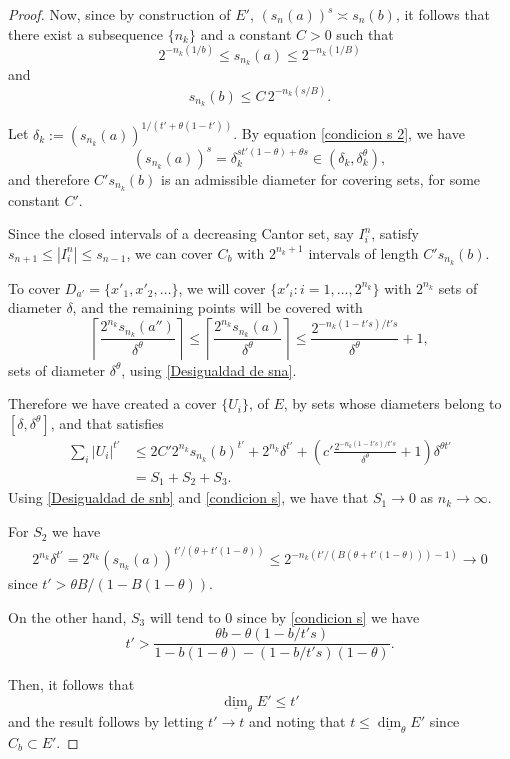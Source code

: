 \documentclass[10pt,a4paper]{amsart}
\begin{document}
\begin{proof}
Now, since by construction of $E'$, $(s_n(a))^s \asymp s_n(b)$, it follows that there exist a subsequence $\{n_k\}$ and a constant $C > 0$ such that
\begin{equation}\label{Desigualdad de sna}
2^{-n_k(1/b)} \leq s_{n_k}(a) \leq 2^{-n_k(1/B)}
\end{equation}
and
\begin{equation}\label{Desigualdad de snb}
s_{n_k}(b) \leq C \, 2^{-n_k(s/B)}.
\end{equation}



Let $\delta_k := (s_{n_k}(a))^{1/(t' + \theta(1 - t'))}$. 
By equation \eqref{condicion s 2}, we have 
\[
(s_{n_k}(a))^s = \delta_k^{s t'(1 - \theta) + \theta s} \in (\delta_k, \delta_k^\theta),
\]
and therefore $C' s_{n_k}(b)$ is an admissible diameter for covering sets, for some constant $C'$.

Since the closed intervals of a decreasing Cantor set, say \( I_i^n \), satisfy \( s_{n+1} \leq |I_i^n| \leq s_{n-1} \), we can cover \( C_b \) with \( 2^{n_k + 1} \) intervals of length \(C' s_{n_k}(b) \).

To cover \( D_{a'} = \{x'_1, x'_2, \ldots\} \), we will cover \( \{x'_i : i = 1, \ldots, 2^{n_k}\} \) with \( 2^{n_k} \) sets of diameter \( \delta \), and the remaining points will be covered with
\[
\left\lceil \frac{2^{n_k} s_{n_k}(a'')}{\delta^\theta} \right\rceil \leq \left\lceil \frac{2^{n_k} s_{n_k}(a)}{\delta^\theta} \right\rceil \leq \frac{2^{-n_k(1 - t's)/t's}}{\delta^\theta} + 1,
\]
sets of diameter \( \delta^\theta \), using \eqref{Desigualdad de sna}.


Therefore we have created a cover \( \{U_i\} \), of \( E \), by sets whose diameters belong to \( [\delta, \delta^{\theta}] \), and that satisfies
\begin{align*}
    \sum_i |U_i|^{t'} &\leq 2C' 2^{n_k} s_{n_k}(b)^{t'} + 2^{n_k} \delta^{t'} + \left( c' \frac{2^{-n_k(1 - t's)/t's}}{\delta^\theta} + 1 \right) \delta^{\theta t'} \\
    &= S_1 + S_2 + S_3.
\end{align*}
Using \eqref{Desigualdad de snb} and \eqref{condicion s}, we have that \( S_1 \to 0 \) as \( n_k \to \infty \).

For \( S_2 \) we have
\begin{align*}
    2^{n_k} \delta^{t'} = 2^{n_k} (s_{n_k}(a))^{t'/(\theta + t'(1 - \theta))} \leq 2^{-n_k(t'/(B(\theta + t'(1 - \theta))) - 1)} \to 0
\end{align*}
since \( t' > \theta B / (1 - B(1 - \theta)) \).

On the other hand, \( S_3 \) will tend to \( 0 \) since by \eqref{condicion s} we have 
\[
t' > \frac{\theta b - \theta(1 - b / t's)}{1 - b(1 - \theta) - (1 - b / t's)(1 - \theta)}.
\]

Then, it follows that
\[
\underline{\dim}_\theta E' \leq t'
\]
and the result follows by letting \( t' \to t \) and noting that \( t \leq \underline{\dim}_\theta E' \) since \( C_b \subset E' \).
\end{proof}
\end{document}
